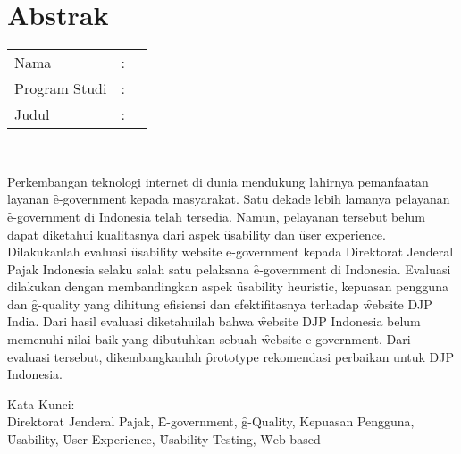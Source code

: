 %
%
%

\chapter*{Abstrak}

\vspace*{0.2cm}

\noindent \begin{tabular}{l l p{10cm}}
	Nama&: & \penulis \\
	Program Studi&: & \program \\
	Judul&: & \judul \\
\end{tabular} \\ 

\vspace*{0.5cm}

\noindent 
Perkembangan teknologi internet di dunia mendukung lahirnya pemanfaatan layanan \f{e-government} kepada masyarakat. Satu dekade lebih lamanya pelayanan \f{e-government} di Indonesia telah tersedia. Namun, pelayanan tersebut belum dapat diketahui kualitasnya dari aspek \f{usability} dan \f{user experience}. Dilakukanlah evaluasi \f{usability website e-government} kepada Direktorat Jenderal Pajak Indonesia selaku salah satu pelaksana \f{e-government} di Indonesia. Evaluasi dilakukan dengan membandingkan aspek \f{usability heuristic}, kepuasan pengguna dan \f{g-quality} yang dihitung efisiensi dan efektifitasnya terhadap \f{website} DJP India. Dari hasil evaluasi diketahuilah bahwa \f{website} DJP Indonesia belum memenuhi nilai baik yang dibutuhkan sebuah \f{website e-government}. Dari evaluasi tersebut, dikembangkanlah \f{prototype} rekomendasi perbaikan untuk DJP Indonesia.
\vspace*{0.2cm}

\noindent Kata Kunci: \\ 
\noindent Direktorat Jenderal Pajak, \f{E-government}, \f{g-Quality}, Kepuasan Pengguna, \f{Usability}, \f{User Experience}, \f{Usability Testing}, \f{Web-based}\\ 

\newpage